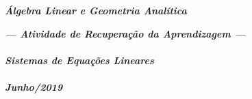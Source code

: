 \documentclass[pdftex, brazil, 12pt, oneside, addpoints]{exam}
\begin{document}
\begin{coverpages}

\begin{center}
\textbf{\textit{\Large%
Álgebra Linear e Geometria Analítica}}
\end{center}

\vspace{1cm}

\begin{figure}[H]
\begin{center}
\end{center}
\end{figure}

\vspace{1cm}

\begin{center}
\textit{\textbf{\Large%
    --- Atividade de Recuperação da Aprendizagem ---\\%
\ \\%
    Sistemas de Equações Lineares\\%
\ \\%
Junho/2019}}
\end{center}



\end{coverpages}
\end{document}
